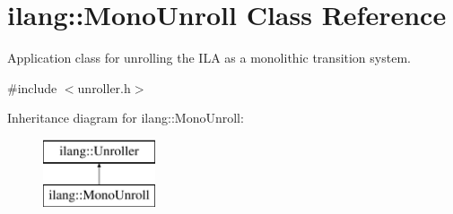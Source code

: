 \hypertarget{classilang_1_1_mono_unroll}{}\section{ilang\+:\+:Mono\+Unroll Class Reference}
\label{classilang_1_1_mono_unroll}


Application class for unrolling the I\+LA as a monolithic transition system.  




{\ttfamily \#include $<$unroller.\+h$>$}

Inheritance diagram for ilang\+:\+:Mono\+Unroll\+:\begin{figure}[H]
\begin{center}
\leavevmode
\includegraphics[height=2.000000cm]{classilang_1_1_mono_unroll}
\end{center}
\end{figure}
